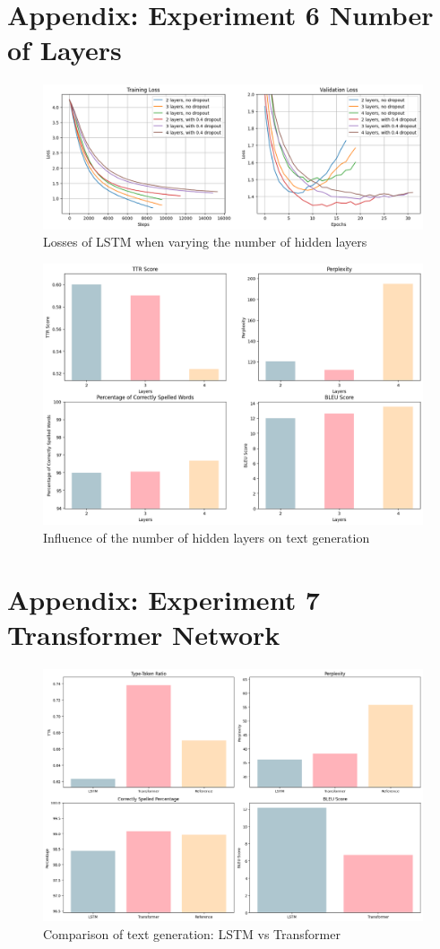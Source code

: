 \documentclass{article}
\begin{document}
\section*{Appendix: Experiment 6 Number of Layers}
\begin{figure}[H]
    \centering
    \includegraphics[width=\linewidth]{figures/LSTM_nb_layers.png}
    \caption{Losses of LSTM when varying the number of hidden layers}
    \label{fig:loss_nb_layers}
\end{figure}

\begin{figure}[H]
    \centering
    \includegraphics[width=0.8\linewidth]{figures/text_nb_layers.png}
    \caption{Influence of the number of hidden layers on text generation}
    \label{fig:text_nb_layers}
\end{figure}

\section*{Appendix: Experiment 7 Transformer Network}

\begin{figure}[H]
    \centering
    \includegraphics[width=0.8\linewidth]{figures/text_transformers.png}
    \caption{Comparison of text generation: LSTM vs Transformer}
    \label{fig:text_transformer}
\end{figure}
\end{document}
